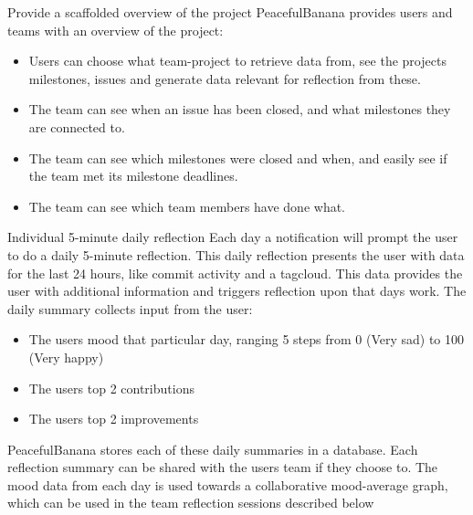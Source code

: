 \begin{description}

	\item{Provide a scaffolded overview of the project} 
	PeacefulBanana provides users and teams with an overview of the project:
		\begin{itemize}
		\item Users can choose what team-project to retrieve data from, see the projects milestones, issues and generate data relevant for reflection from these.
		\item The team can see when an issue has been closed, and what milestones they are connected to.
		\item The team can see which milestones were closed and when, and easily see if the team met its milestone deadlines. 
		\item The team can see which team members have done what.
		\end{itemize}

	\item {Individual 5-minute daily reflection} 
	Each day a notification will prompt the user to do a daily 5-minute reflection. This daily reflection presents the user with data for the last 24 hours, like commit activity and a tagcloud. This data provides the user with additional information and triggers reflection upon that days work. The daily summary collects input from the user:
		\begin{itemize}
		\item The users mood that particular day, ranging 5 steps from 0 (Very sad) to 100 (Very happy)
		\item The users top 2 contributions
		\item The users top 2 improvements
		\end{itemize}
	PeacefulBanana stores each of these daily summaries in a database. Each reflection summary can be shared with the users team if they choose to. The mood data from each day is used towards a collaborative mood-average graph, which can be used in the team reflection sessions described below


\end{description}

